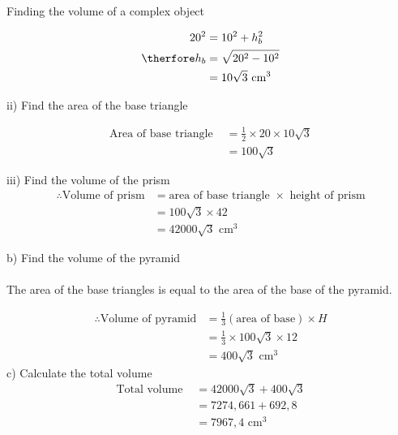 \begin{wex}{Finding the volume of a complex object}
{\begin{align*}
 20^2 &= 10^2 + h_b^2\\
\therfore h_b&= \sqrt{20^2-10^2}\\
&=10 \sqrt{3}\mbox{ cm}^3
\end{align*}

ii) Find the area of the base triangle
% 

\begin{align*}
\mbox{Area of base triangle } &= \frac{1}{2} \times 20 \times 10 \sqrt{3}\\
&=100 \sqrt{3}
\end{align*}

iii) Find the volume of the prism
\begin{align*}
\therefore \mbox{Volume of prism} &= \mbox{area of base triangle }\times \mbox{ height of prism}\\
&=100 \sqrt{3} \times 42\\
&=42000\sqrt{3}\mbox{ cm}^3
\end{align*}

b) Find the volume of the pyramid\\
\\
The area of the base triangles is equal to the area of the base of the pyramid.

\begin{align*}
\therefore \mbox{Volume of pyramid} &= \frac{1}{3} (\mbox{area of base}) \times H\\
&= \frac{1}{3} \times 100 \sqrt{3} \times 12 \\

&=400\sqrt{3}\mbox{ cm}^3
\end{align*}
c) Calculate the total volume
\begin{align*}
\mbox{Total volume } &= 42000\sqrt{3}+400\sqrt{3}\\
&= 7274,661 + 692,8\\
&=7967,4\mbox{ cm}^3
\end{align*}

}
\end{wex}
